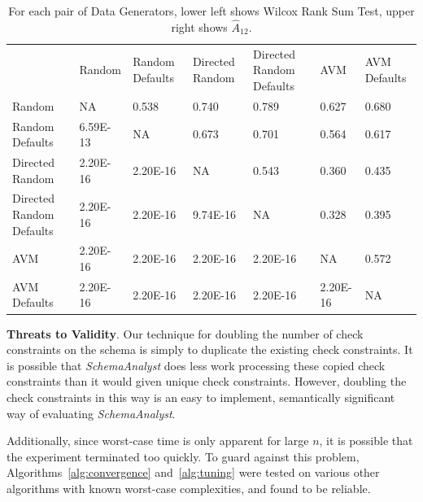 \begin{table}[h]
\begin{tabular}{lllllll}
                         & Random   & Random Defaults & Directed Random & Directed Random Defaults & AVM      & AVM Defaults \\
Random                   & NA       & 0.538
&\cellcolor{gray!65} 0.740           &\cellcolor{gray!65} 0.789
&\cellcolor{gray!25} 0.627    &\cellcolor{gray!45} 0.680        \\
Random Defaults          & 6.59E-13 & NA              &
\cellcolor{gray!45}0.673           &\cellcolor{gray!45} 0.701
&\cellcolor{gray!25} 0.564    & \cellcolor{gray!25}0.617        \\
Directed Random          & 2.20E-16 & 2.20E-16        & NA
& 0.543                    &\cellcolor{gray!25} 0.360    &\cellcolor{gray!25} 0.435        \\
Directed Random Defaults & 2.20E-16 & 2.20E-16        & 9.74E-16
& NA                       &\cellcolor{gray!45} 0.328    &\cellcolor{gray!25} 0.395        \\
AVM                      & 2.20E-16 & 2.20E-16        & 2.20E-16
& 2.20E-16                 & NA       &\cellcolor{gray!25} 0.572        \\
AVM Defaults             & 2.20E-16 & 2.20E-16        & 2.20E-16        & 2.20E-16                 & 2.20E-16 & NA
\end{tabular}
\caption{For each pair of Data Generators, lower left shows Wilcox Rank
Sum Test, upper right shows $\hat{A}_{12}$.}
\label{tab:datas}
\end{table}


\textbf{Threats to Validity}. Our technique for doubling the number of check constraints on the schema is simply to
duplicate the existing check constraints. It is possible that \textit{SchemaAnalyst} does less work processing these
copied check constraints than it would given unique check constraints. However, doubling the check constraints in this
way is an easy to implement, semantically significant way of evaluating \textit{SchemaAnalyst}.

Additionally, since worst-case time is only apparent for large $n$, it is possible that the experiment terminated too
quickly.  To guard against this problem, Algorithms~\ref{alg:convergence} and~\ref{alg:tuning} were tested on various
other algorithms with known worst-case complexities, and found to be reliable.
